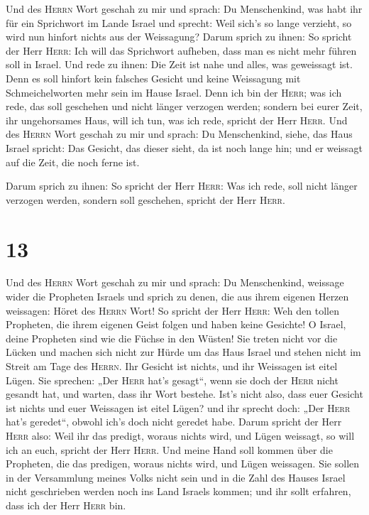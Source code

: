  Und des \textsc{Herrn} Wort geschah zu mir und sprach:
 Du Menschenkind, was habt ihr für ein Sprichwort im
Lande Israel und sprecht: Weil sich's so lange verzieht, so wird nun
hinfort nichts aus der Weissagung?  Darum sprich zu
ihnen: So spricht der Herr \textsc{Herr}: Ich will das Sprichwort
aufheben, dass man es nicht mehr führen soll in Israel. Und rede zu
ihnen: Die Zeit ist nahe und alles, was geweissagt ist. 
Denn es soll hinfort kein falsches Gesicht und keine Weissagung mit
Schmeichelworten mehr sein im Hause Israel.  Denn ich bin
der \textsc{Herr}; was ich rede, das soll geschehen und nicht länger
verzogen werden; sondern bei eurer Zeit, ihr ungehorsames Haus, will ich
tun, was ich rede, spricht der Herr \textsc{Herr}.  Und
des \textsc{Herrn} Wort geschah zu mir und sprach:  Du
Menschenkind, siehe, das Haus Israel spricht: Das Gesicht, das dieser
sieht, da ist noch lange hin; und er weissagt auf die Zeit, die noch
ferne ist.

 Darum sprich zu ihnen: So spricht der Herr
\textsc{Herr}: Was ich rede, soll nicht länger verzogen werden, sondern
soll geschehen, spricht der Herr \textsc{Herr}.

\hypertarget{section-12}{%
\section{13}\label{section-12}}

 Und des \textsc{Herrn} Wort geschah zu mir und sprach:
 Du Menschenkind, weissage wider die Propheten Israels und
sprich zu denen, die aus ihrem eigenen Herzen weissagen: Höret des
\textsc{Herrn} Wort!  So spricht der Herr \textsc{Herr}:
Weh den tollen Propheten, die ihrem eigenen Geist folgen und haben keine
Gesichte!  O Israel, deine Propheten sind wie die Füchse
in den Wüsten!  Sie treten nicht vor die Lücken und machen
sich nicht zur Hürde um das Haus Israel und stehen nicht im Streit am
Tage des \textsc{Herrn}.  Ihr Gesicht ist nichts, und ihr
Weissagen ist eitel Lügen. Sie sprechen: „Der \textsc{Herr} hat's
gesagt``, wenn sie doch der \textsc{Herr} nicht gesandt hat, und warten,
dass ihr Wort bestehe.  Ist's nicht also, dass euer
Gesicht ist nichts und euer Weissagen ist eitel Lügen? und ihr sprecht
doch: „Der \textsc{Herr} hat's geredet``, obwohl ich's doch nicht
geredet habe.  Darum spricht der Herr \textsc{Herr} also:
Weil ihr das predigt, woraus nichts wird, und Lügen weissagt, so will
ich an euch, spricht der Herr \textsc{Herr}.  Und meine
Hand soll kommen über die Propheten, die das predigen, woraus nichts
wird, und Lügen weissagen. Sie sollen in der Versammlung meines Volks
nicht sein und in die Zahl des Hauses Israel nicht geschrieben werden
noch ins Land Israels kommen; und ihr sollt erfahren, dass ich der Herr
\textsc{Herr} bin.


